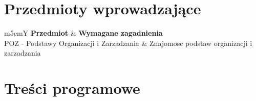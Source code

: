 \documentclass[12pt, a4paper]{article}
\newcommand{\thdrule}{\noalign{\global\setlength{\extrarowheight}{0pt}}}
\newcommand{\thdend}{\noalign{\global\setlength{\extrarowheight}{3pt}}}
\begin{document}
\section{Przedmioty wprowadzające}

{\scriptsize
\begin{tabularx}{\textwidth}{m{5cm}Y}
\thdrule\toprule
{} {\color{white}\textbf{Przedmiot}} & {\color{white}\textbf{Wymagane zagadnienia}} \\
\midrule\thdend
   POZ - Podstawy Organizacji i Zarzadzania & Znajomosc podstaw organizacji i zarzadzania \\
\bottomrule
\end{tabularx}}

\section{Treści programowe}
\end{document}
